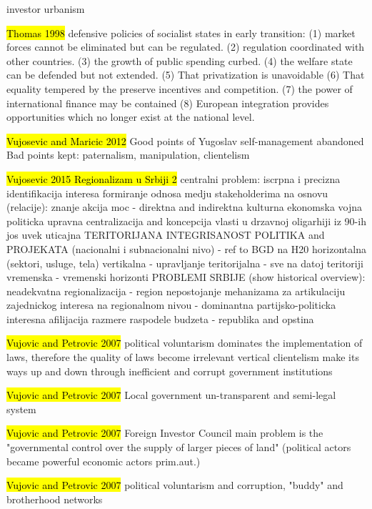 \documentclass[11pt]{report}
\begin{document}
investor urbanism

\hl{Thomas 1998}
defensive policies of socialist states in early transition:
(1) market  forces  cannot  be  eliminated  but  can  be  regulated.
(2) regulation coordinated  with  other  countries.
(3) the growth  of public  spending curbed.
(4) the welfare  state can be defended  but  not  extended.
(5)  That  privatization  is  unavoidable
(6)  That  equality tempered  by  the  preserve incentives  and  competition.
(7) the  power  of  international  finance  may  be  contained
(8) European  integration  provides  opportunities  which  no longer  exist  at the national  level.

\hl{Vujosevic and Maricic 2012}
Good points of Yugoslav self-management abandoned
Bad points kept: paternalism, manipulation, clientelism

\hl{Vujosevic 2015 Regionalizam u Srbiji 2}
centralni problem: iscrpna i precizna identifikacija interesa
formiranje odnosa medju stakeholderima na osnovu (relacije):
    znanje
    akcija
    moc - direktna and indirektna
        kulturna
        ekonomska
        vojna
        politicka
upravna centralizacija and koncepcija vlasti u drzavnoj oligarhiji iz 90-ih jos uvek uticajna
TERITORIJANA INTEGRISANOST POLITIKA and PROJEKATA (nacionalni i subnacionalni nivo) - ref to BGD na H20
    horizontalna (sektori, usluge, tela)
    vertikalna - upravljanje
    teritorijalna - sve na datoj teritoriji
    vremenska - vremenski horizonti
PROBLEMI SRBIJE (show historical overview):
    neadekvatna regionalizacija  - region
    nepostojanje mehanizama za artikulaciju zajednickog interesa na regionalnom nivou - dominantna partijsko-politicka interesna afilijacija
    razmere raspodele budzeta - republika and opstina

\hl{Vujovic and Petrovic 2007}
political voluntarism dominates the implementation of laws, therefore the quality of laws become irrelevant
vertical clientelism make its ways up and down through inefficient and corrupt government institutions

\hl{Vujovic and Petrovic 2007}
Local government un-transparent and semi-legal system 

\hl{Vujovic and Petrovic 2007}
	Foreign Investor Council
main problem is the "governmental control over the supply of larger pieces of land" (political actors became powerful economic actors prim.aut.)

\hl{Vujovic and Petrovic 2007}
political voluntarism and corruption, "buddy" and brotherhood networks
\end{document}
